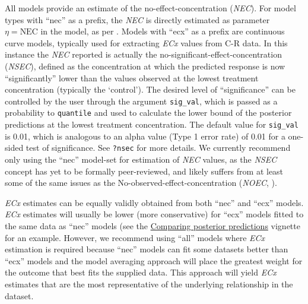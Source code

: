 \documentclass[
]{jss}
\begin{document}
All models provide an estimate of the no-effect-concentration
(\emph{NEC}). For model types with ``nec'' as a prefix, the \emph{NEC}
is directly estimated as parameter \(\eta = \text{NEC}\) in the model,
as per \citet{Fox2010}. Models with ``ecx'' as a prefix are continuous
curve models, typically used for extracting \emph{ECx} values from C-R
data. In this instance the \emph{NEC} reported is actually the
no-significant-effect-concentration (\emph{NSEC}), defined as the
concentration at which the predicted response is now ``significantly''
lower than the values observed at the lowest treatment concentration
(typically the `control'). The desired level of ``significance'' can be
controlled by the user through the argument \texttt{sig\_val}, which is
passed as a probability to \texttt{quantile} and used to calculate the
lower bound of the posterior predictions at the lowest treatment
concentration. The default value for \texttt{sig\_val} is 0.01, which is
analogous to an alpha value (Type 1 error rate) of 0.01 for a one-sided
test of significance. See \texttt{?nsec} for more details. We currently
recommend only using the ``nec'' model-set for estimation of \emph{NEC}
values, as the \emph{NSEC} concept has yet to be formally peer-reviewed,
and likely suffers from at least some of the same issues as the
No-observed-effect-concentration (\emph{NOEC},
\citep{Warne2008a, Fox2008}).

\emph{ECx} estimates can be equally validly obtained from both ``nec''
and ``ecx'' models. \emph{ECx} estimates will usually be lower (more
conservative) for ``ecx'' models fitted to the same data as ``nec''
models (see the
\href{https://open-aims.github.io/bayesnec/articles/example4.html}{Comparing
posterior predictions} vignette for an example. However, we recommend
using ``all'' models where \emph{ECx} estimation is required because
``nec'' models can fit some datasets better than ``ecx'' models and the
model averaging approach will place the greatest weight for the outcome
that best fits the supplied data. This approach will yield \emph{ECx}
estimates that are the most representative of the underlying
relationship in the dataset.
\end{document}
